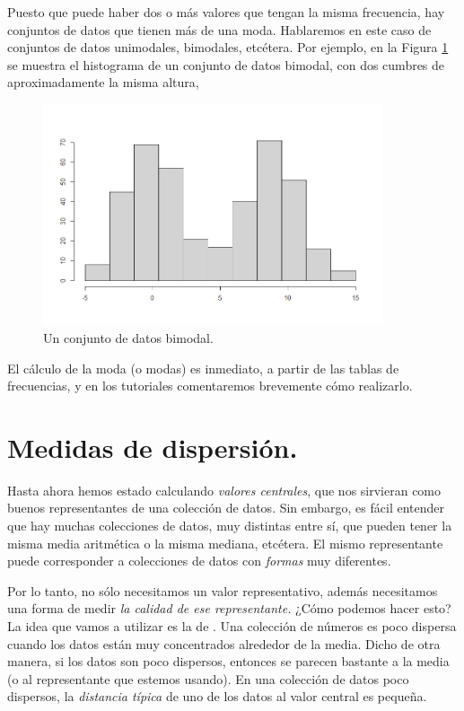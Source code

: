 Puesto que puede haber dos o más valores que tengan la misma frecuencia, hay
conjuntos de datos que tienen más de una moda. Hablaremos en este caso de
conjuntos de datos unimodales, bimodales,
etcétera. Por ejemplo, en la Figura \ref{cap02:fig:DatosBimodales} se muestra
el histograma de un conjunto de datos bimodal, con dos cumbres de
aproximadamente la misma altura,
    \begin{figure}[h]
	\centering
    \includegraphics[width=10cm]{../fig/Cap02-DatosBimodales.png}
	\caption{Un conjunto de datos bimodal.}
	\label{cap02:fig:DatosBimodales}
    \end{figure}
El cálculo de la moda (o modas) es inmediato, a partir de las tablas de
frecuencias, y en los tutoriales comentaremos brevemente cómo realizarlo.


\section{Medidas de dispersión.}
\label{cap02:sec:MedidasDispersion}


Hasta ahora hemos estado calculando {\em valores centrales}, que nos sirvieran
como buenos representantes de una colección de datos. Sin embargo, es fácil
entender que hay muchas colecciones de datos, muy distintas entre sí, que
pueden tener la misma media aritmética o la misma mediana, etcétera. El mismo
representante puede corresponder a colecciones de datos con {\em formas} muy
diferentes.

Por lo tanto, no sólo necesitamos un valor representativo, además necesitamos
una forma de medir {\em la calidad de ese representante.} ¿Cómo podemos hacer
esto? La idea que vamos a utilizar es la de .
Una colección de números es poco dispersa cuando los datos están muy
concentrados alrededor de la media. Dicho de otra manera, si los datos son poco
dispersos, entonces se parecen bastante a la media (o al representante que
estemos usando). En una colección de datos poco dispersos, la {\em distancia
típica} de uno de los datos al valor central es pequeña.


